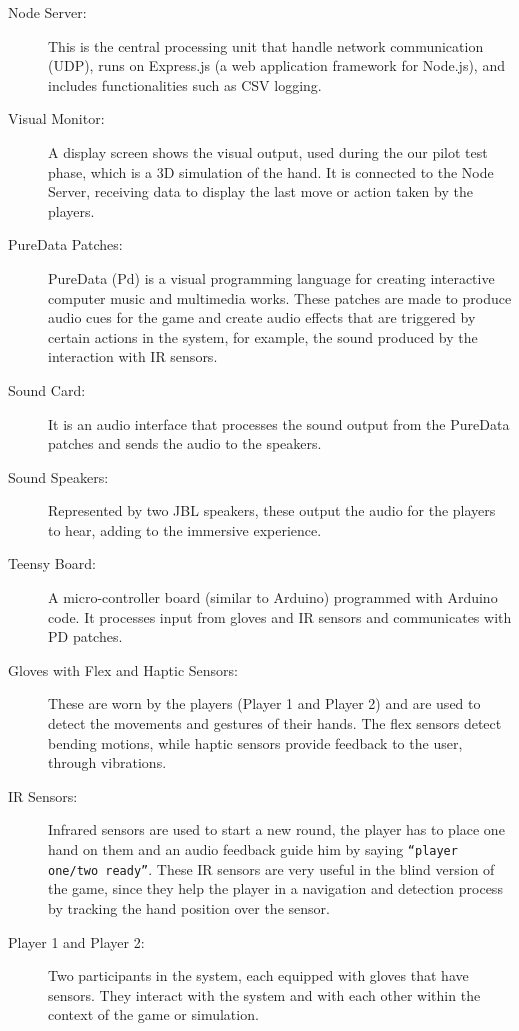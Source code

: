 \documentclass[11pt,a4paper]{report}
\begin{document}
\begin{description}
  \item [Node Server:] This is the central processing unit that handle network communication (UDP), runs on Express.js (a web application framework for Node.js), and includes functionalities such as CSV logging. 
  \item [Visual Monitor:] A display screen shows the visual output, used during the our pilot test phase, which is a 3D simulation of the hand. It is connected to the Node Server, receiving data to display the last move or action taken by the players.
  \item [PureData Patches:] PureData (Pd) is a visual programming language for creating interactive computer music and multimedia works. These patches are made to produce audio cues for the game and create audio effects that are triggered by certain actions in the system, for example, the sound produced by the interaction with IR sensors.
  \item [Sound Card:] It is an audio interface that processes the sound output from the PureData patches and sends the audio to the speakers.
  \item [Sound Speakers:] Represented by two JBL speakers, these output the audio for the players to hear, adding to the immersive experience.
  \item [Teensy Board:] A micro-controller board (similar to Arduino) programmed with Arduino code. It processes input from gloves and IR sensors and communicates with PD patches.
  \item [Gloves with Flex and Haptic Sensors:] These are worn by the players (Player 1 and Player 2) and are used to detect the movements and gestures of their hands. The flex sensors detect bending motions, while haptic sensors provide feedback to the user, through vibrations.
  \item [IR Sensors:] Infrared sensors are used to start a new round, the player has to place one hand on them and an audio feedback guide him by saying \texttt{“player one/two ready”}. These IR sensors are very useful in the blind version of the game, since they help the player in a navigation and detection process by tracking the hand position over the sensor.
  \item [Player 1 and Player 2:] Two participants in the system, each equipped with gloves that have sensors. They interact with the system and with each other within the context of the game or simulation.
\end{description}
\end{document}
